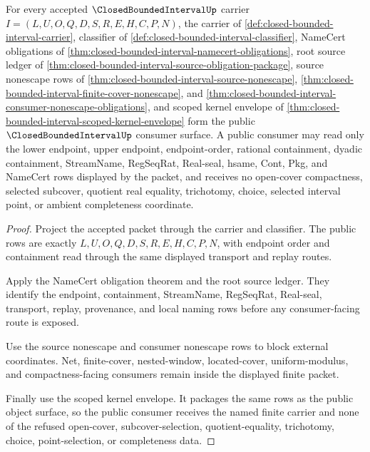 \begin{theorem}
\label{thm:closed-bounded-interval-public-consumer-surface}
For every accepted $\ClosedBoundedIntervalUp$ carrier $I=(L,U,O,Q,D,S,R,E,H,C,P,N)$, the carrier of \autoref{def:closed-bounded-interval-carrier}, classifier of \autoref{def:closed-bounded-interval-classifier}, NameCert obligations of \autoref{thm:closed-bounded-interval-namecert-obligations}, root source ledger of \autoref{thm:closed-bounded-interval-source-obligation-package}, source nonescape rows of \autoref{thm:closed-bounded-interval-source-nonescape}, \autoref{thm:closed-bounded-interval-finite-cover-nonescape}, and \autoref{thm:closed-bounded-interval-consumer-nonescape-obligations}, and scoped kernel envelope of \autoref{thm:closed-bounded-interval-scoped-kernel-envelope} form the public $\ClosedBoundedIntervalUp$ consumer surface. A public consumer may read only the lower endpoint, upper endpoint, endpoint-order, rational containment, dyadic containment, StreamName, RegSeqRat, Real-seal, hsame, Cont, Pkg, and NameCert rows displayed by the packet, and receives no open-cover compactness, selected subcover, quotient real equality, trichotomy, choice, selected interval point, or ambient completeness coordinate.
\end{theorem}
\begin{proof}
Project the accepted packet through the carrier and classifier. The public rows are exactly $L,U,O,Q,D,S,R,E,H,C,P,N$, with endpoint order and containment read through the same displayed transport and replay routes.

Apply the NameCert obligation theorem and the root source ledger. They identify the endpoint, containment, StreamName, RegSeqRat, Real-seal, transport, replay, provenance, and local naming rows before any consumer-facing route is exposed.

Use the source nonescape and consumer nonescape rows to block external coordinates. Net, finite-cover, nested-window, located-cover, uniform-modulus, and compactness-facing consumers remain inside the displayed finite packet.

Finally use the scoped kernel envelope. It packages the same rows as the public object surface, so the public consumer receives the named finite carrier and none of the refused open-cover, subcover-selection, quotient-equality, trichotomy, choice, point-selection, or completeness data.
\end{proof}

